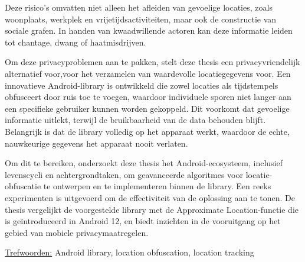 Deze risico's omvatten niet alleen het afleiden van gevoelige locaties, zoals woonplaats, werkplek en vrijetijdsactiviteiten, maar ook de constructie van sociale grafen. In handen van kwaadwillende actoren kan deze informatie leiden tot chantage, dwang of haatmisdrijven.

Om deze privacyproblemen aan te pakken, stelt deze thesis een privacyvriendelijk alternatief voor,voor het verzamelen van waardevolle locatiegegevens voor. Een innovatieve Android-library is ontwikkeld die zowel locaties als tijdstempels obfusceert door ruis toe te voegen, waardoor individuele sporen niet langer aan een specifieke gebruiker kunnen worden gekoppeld. Dit voorkomt dat gevoelige informatie uitlekt, terwijl de bruikbaarheid van de data behouden blijft. Belangrijk is dat de library volledig op het apparaat werkt, waardoor de echte, nauwkeurige gegevens het apparaat nooit verlaten.

Om dit te bereiken, onderzoekt deze thesis het Android-ecosysteem, inclusief levenscycli en achtergrondtaken, om geavanceerde algoritmes voor locatie-obfuscatie te ontwerpen en te implementeren binnen de library.
Een reeks experimenten is uitgevoerd om de effectiviteit van de oplossing aan te tonen. De thesis vergelijkt de voorgestelde library met de Approximate Location-functie die is geïntroduceerd in Android 12, en biedt inzichten in de vooruitgang op het gebied van mobiele privacymaatregelen.


\underline{Trefwoorden:} Android library, location obfuscation, location tracking